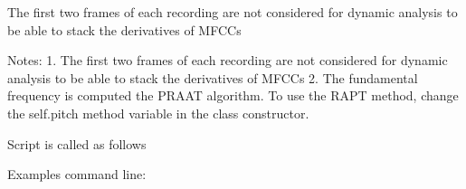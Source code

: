 \documentclass[letterpaper,10pt,english]{sphinxmanual}
\begin{document}
\begin{fulllineitems}
The first two frames of each recording are not considered for dynamic analysis to be able to stack the derivatives of MFCCs

Notes:
1. The first two frames of each recording are not considered for dynamic analysis to be able to stack the derivatives of MFCCs
2. The fundamental frequency is computed the PRAAT algorithm. To use the RAPT method,  change the \sphinxquotedblleft{}self.pitch method\sphinxquotedblright{} variable in the class constructor.

Script is called as follows

\begin{sphinxVerbatim}[commandchars=\\\{\}]
                 
\end{sphinxVerbatim}

Examples command line:


\end{fulllineitems}
\end{document}
